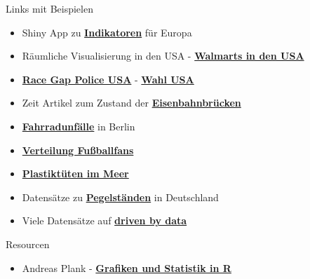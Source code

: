 \documentclass[ignorenonframetext,]{beamer}
\providecommand{\tightlist}{%
  \setlength{\itemsep}{0pt}\setlength{\parskip}{0pt}}
\begin{document}
\begin{frame}{Links mit Beispielen}

\begin{itemize}
\item
  Shiny App zu
  \href{https://japhilko.shinyapps.io/Choropleths/}{\textbf{Indikatoren}}
  für Europa
\item
  Räumliche Visualisierung in den USA -
  \href{https://rpubs.com/Radcliffe/walmart}{\textbf{Walmarts in den
  USA}}
\item
  \href{http://www.nytimes.com/interactive/2014/09/03/us/the-race-gap-in-americas-police-departments.html?_r=0}{\textbf{Race
  Gap Police USA}} - \href{http://fivethirtyeight.com/}{\textbf{Wahl
  USA}}
\item
  Zeit Artikel zum Zustand der
  \href{http://detektor.fm/digital/datenjournalismus-interaktive-karte-zeigt-marode-deutsche-bahn-bruecken}{\textbf{Eisenbahnbrücken}}
\item
  \href{http://michael-hoerz.de/maps/berlin-bike/}{\textbf{Fahrradunfälle}}
  in Berlin
\item
  \href{http://interaktiv.morgenpost.de/beta-fussballkarte/\#7/51.258/10.756}{\textbf{Verteilung
  Fußballfans}}
\item
  \href{http://news.nationalgeographic.com/news/2014/07/140715-ocean-plastic-debris-trash-pacific-garbage-patch/}{\textbf{Plastiktüten
  im Meer}}
\end{itemize}

\begin{itemize}
\tightlist
\item
  Datensätze zu
  \href{https://www.pegelonline.wsv.de/gast/start}{\textbf{Pegelständen}}
  in Deutschland
\item
  Viele Datensätze auf \href{http://driven-by-data.net/}{\textbf{driven
  by data}}
\end{itemize}

\begin{block}{Resourcen}

\begin{itemize}
\tightlist
\item
  Andreas Plank -
  \href{http://www.chironomidaeproject.com/fileadmin/downloads/Formeln_in_R.pdf}{\textbf{Grafiken
  und Statistik in R}}
\end{itemize}

\end{block}

\end{frame}
\end{document}
